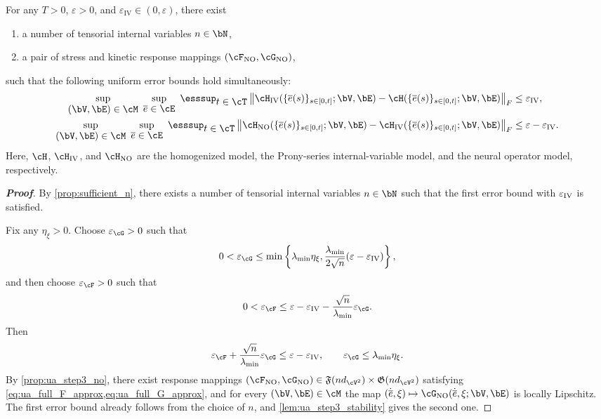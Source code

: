 \begin{lemma}\label{prop:ua_step4_final}
For any $T>0$, $\varepsilon>0$, and $\varepsilon_{\mathrm{IV}}\in(0,\varepsilon)$, there exist
\begin{enumerate}[label=(\roman*)]
    \item a number of tensorial internal variables $n\in\bN$,
    \item a pair of stress and kinetic response mappings $(\cF_{\rm NO},\cG_{\rm NO})$,
\end{enumerate}
such that the following uniform error bounds hold simultaneously:
\begin{align*}
\sup_{\displaystyle(\bV,\bE)\in\cM}\ \sup_{\displaystyle\overline{e}\in\cE}\ \esssup_{\displaystyle t\in\cT}
\left\|\cH_{\mathrm{IV}}(\{\overline{e}(s)\}_{s\in[0,t]};\bV,\bE)
-\cH(\{\overline{e}(s)\}_{s\in[0,t]};\bV,\bE)\right\|_F
&\leq \varepsilon_{\mathrm{IV}},\\
\sup_{\displaystyle(\bV,\bE)\in\cM}\ \sup_{\displaystyle\overline{e}\in\cE}\ \esssup_{\displaystyle t\in\cT}
\left\|\cH_{\mathrm{NO}}(\{\overline{e}(s)\}_{s\in[0,t]};\bV,\bE)
-\cH_{\mathrm{IV}}(\{\overline{e}(s)\}_{s\in[0,t]};\bV,\bE)\right\|_F
&\leq \varepsilon - \varepsilon_{\mathrm{IV}}.
\end{align*}
Here, $\cH$, $\cH_{\rm IV}$, and $\cH_{\rm NO}$ are the homogenized model, the Prony-series internal-variable model, and the neural operator model, respectively.
\end{lemma}

\begin{proof}[\bf Proof]
By \cref{prop:sufficient_n}, there exists a number of tensorial internal variables $n\in\bN$ such that the first error bound with $\varepsilon_{\rm IV}$ is satisfied.

Fix any $\eta_{\xi}>0$. Choose $\varepsilon_{\cG}>0$ such that
\begin{equation*}
    0<\varepsilon_{\cG} \leq \min\left\{\lambda_{\min}\eta_{\xi}, \frac{\lambda_{\min}}{2\sqrt{n}}(\varepsilon - \varepsilon_{\mathrm{IV}})\right\},
\end{equation*}
and then choose $\varepsilon_{\cF}>0$ such that
\begin{equation*}
    0<\varepsilon_{\cF} \leq \varepsilon - \varepsilon_{\mathrm{IV}} - \frac{\sqrt{n}}{\lambda_{\min}}\varepsilon_{\cG}.
\end{equation*}
Then
\begin{equation*}
\varepsilon_{\cF}+\frac{\sqrt{n}}{\lambda_{\min}}\varepsilon_{\cG}\le \varepsilon-\varepsilon_{\mathrm{IV}},
\qquad
\varepsilon_{\cG}\le \lambda_{\min}\eta_{\xi}.
\end{equation*}
By \cref{prop:ua_step3_no}, there exist response mappings $(\cF_{\rm NO},\cG_{\rm NO})\in \mathfrak{F}(nd_{\cV^2})\times\mathfrak{G}(nd_{\cV^2})$ satisfying \cref{eq:ua_full_F_approx,eq:ua_full_G_approx}, and for every $(\bV,\bE)\in\cM$ the map $(\dot{\overline e},\xi)\mapsto \cG_{\rm NO}(\dot{\overline e},\xi;\bV,\bE)$ is locally Lipschitz. The first error bound already follows from the choice of $n$, and \cref{lem:ua_step3_stability} gives the second one.
\end{proof}